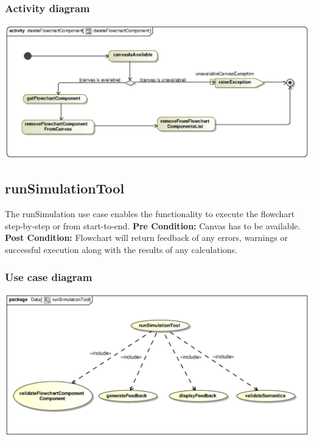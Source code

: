 \documentclass[11pt,a4paper,titlepage]{article}
\begin{document}
\subsubsection{Activity diagram}
\includegraphics[width=500px]{deleteFlowchartComponentActivity.eps}

\subsection{runSimulationTool}
The runSimulation use case enables the functionality to execute the flowchart step-by-step or from start-to-end.
\newline\newline
\textbf{Pre Condition:} Canvas has to be available.
\newline\newline
\textbf{Post Condition:} Flowchart will return feedback of any errors, warnings or successful execution along with the results of any calculations.

\subsubsection{Use case diagram}
\includegraphics[width=500px]{runSimulationToolUseCase.eps}
\end{document}
